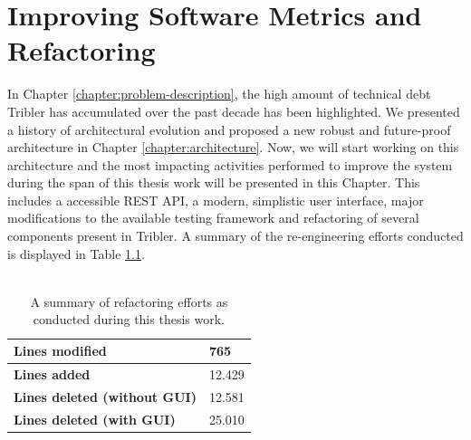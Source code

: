\chapter{Improving Software Metrics and Refactoring}
\label{chapter:refactoring}
In Chapter \ref{chapter:problem-description}, the high amount of technical debt Tribler has accumulated over the past decade has been highlighted. We presented a history of architectural evolution and proposed a new robust and future-proof architecture in Chapter \ref{chapter:architecture}. Now, we will start working on this architecture and the most impacting activities performed to improve the system during the span of this thesis work will be presented in this Chapter. This includes a accessible REST API, a modern, simplistic user interface, major modifications to the available testing framework and refactoring of several components present in Tribler. A summary of the re-engineering efforts conducted is displayed in Table \ref{table:refactoring-summary}.\\\\

\begin{table}[h!]
	\centering
	\begin{tabular}{|l|l|}
		\hline
		\textbf{Lines modified} & 765 \\ \hline
		\textbf{Lines added} & 12.429 \\ \hline
		\textbf{Lines deleted (without GUI)} & 12.581 \\ \hline
		\textbf{Lines deleted (with GUI)} & 25.010 \\ \hline
	\end{tabular}
	\caption{A summary of refactoring efforts as conducted during this thesis work.}
	\label{table:refactoring-summary}
\end{table}

